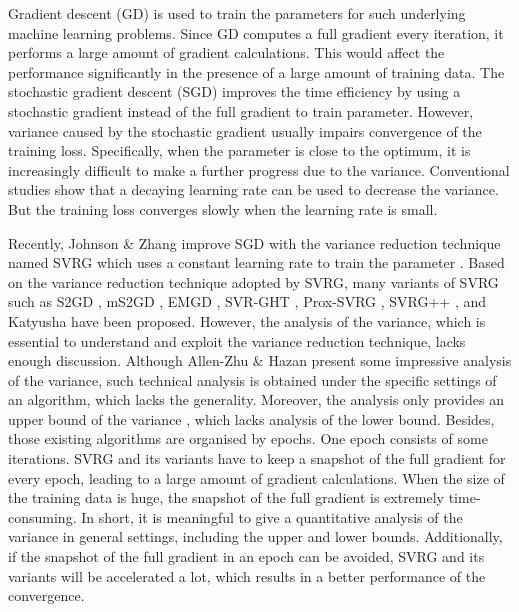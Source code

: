 \documentclass[letterpaper]{article}
\begin{document}
Gradient descent (GD) is used to train the parameters for such underlying machine learning problems. Since GD computes a full gradient every iteration, it performs a large amount of gradient calculations.  This would affect the performance significantly in the presence of a large amount of training data. The stochastic gradient descent (SGD) improves the time efficiency by using a stochastic gradient instead of the full gradient to train parameter. However, variance caused by the stochastic gradient usually impairs convergence of the training loss. Specifically, when the parameter is close to the optimum, it is increasingly difficult to make a further progress  due to the variance. Conventional studies show that a decaying learning rate can be used to decrease the variance. But the training loss converges slowly when the learning rate is small. 

Recently, Johnson \& Zhang improve SGD with the variance reduction technique named SVRG which uses a constant learning rate to train the parameter \cite{Johnson:9MAvkbgy}.  Based on the variance reduction technique adopted by SVRG, many variants of SVRG such as S2GD \cite{Richtarik:2013te}, mS2GD \cite{Liu:2015bx}, EMGD \cite{Zhang2013Linear}, SVR-GHT \cite{Li:2016vh}, Prox-SVRG \cite{Xiao:2014vw}, SVRG++ \cite{Allen2015Improved}, and Katyusha \cite{Allenzhu2016Katyusha} have been proposed. However, the analysis of the variance, which is essential to understand and exploit the variance reduction technique, lacks enough discussion. Although Allen-Zhu \& Hazan  present some impressive analysis of the variance, such technical analysis is obtained under the specific settings of an algorithm, which lacks the generality. Moreover, the analysis only provides an upper bound of the variance  \cite{AllenZhu:2016up}, which lacks analysis of the lower bound. Besides, those existing algorithms are organised by epochs. One epoch consists of some iterations. SVRG and its variants have to keep a snapshot of the full gradient for every epoch, leading to a large amount of gradient calculations. When the size of the training data is huge, the snapshot of the full gradient is extremely time-consuming.   In short, it is meaningful to give a quantitative analysis  of the variance in general settings, including the upper and lower bounds.  Additionally, if the snapshot of the full gradient in an epoch can be avoided, SVRG and its variants will be accelerated a lot, which results in a better performance of the convergence.
 
\end{document}

